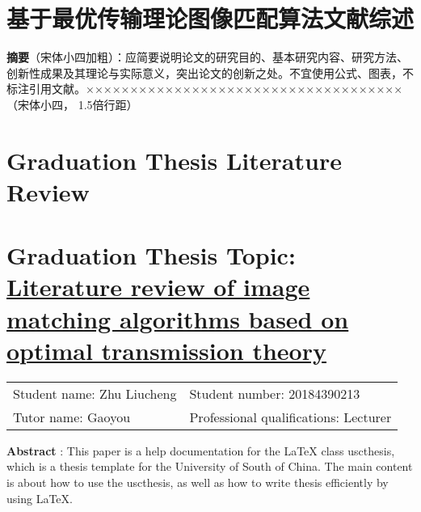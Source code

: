 \maketitle%
\intobmk\section*{基于最优传输理论图像匹配算法文献综述}%

\setcounter{page}{1}%

\noindent
\textbf{摘要}（宋体小四加粗）：应简要说明论文的研究目的、基本研究内容、研究方法、创新性成果及其理论与实际意义，突出论文的创新之处。不宜使用公式、图表，不标注引用文献。××××××××××××××××××××××××××××××××××××（宋体小四， 1.5倍行距）


\intobmk\section*{\textbf{Graduation Thesis Literature Review}}
\vspace*{20pt}

\intobmk\section*{\textbf{Graduation Thesis Topic:}  \uline{Literature review of image matching algorithms based on optimal transmission theory}}

\begin{tabular}{ll}\centering
    Student name: Zhu Liucheng     &    Student number: 20184390213 \\
    Tutor name:   Gaoyou           &    Professional qualifications: Lecturer
\end{tabular}

\vspace*{20pt}

\noindent
\textbf{Abstract} : This paper is a help documentation for the \LaTeX{} class uscthesis, which is  a thesis template for the University of South of China. The main content is about how to use the uscthesis, as well as how to write thesis efficiently by using \LaTeX{}.

